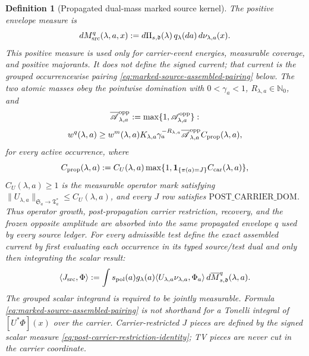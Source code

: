 \documentclass[11pt]{article}
\newtheorem{definition}[theorem]{Definition}
\newcommand{\one}{\mathbf 1}
\begin{document}
\begin{definition}[Propagated dual-mass marked source kernel]
The positive envelope measure is
\begin{equation}
\label{eq:source-incidence-space}
 dM_{\rm src}^{q}(\lambda,a,x):=
 d\Pi_{s,\mathfrak d}(\lambda)\,q_\lambda(da)\,d\nu_{\lambda,a}(x).
\end{equation}
This positive measure is used only for carrier-event energies, measurable
coverage, and positive majorants.  It does not define the signed current;
that current is the grouped occurrencewise pairing
\eqref{eq:marked-source-assembled-pairing} below.
The two atomic masses obey the pointwise domination
with $0<\gamma_a<1$, $R_{\lambda,a}\in\mathbb N_0$, and
\begin{equation}
\label{eq:opposite-amplitude-floor}
 \overline{\mathscr A}_{\lambda,a}^{\rm opp}
 :=\max\{1,\mathscr A_{\lambda,a}^{\rm opp}\}:
\end{equation}
\begin{equation}
\label{eq:source-incidence-envelope}
 w^q(\lambda,a)\ge w^m(\lambda,a)K_{\lambda,a}
 \gamma_a^{-R_{\lambda,a}}\overline{\mathscr A}_{\lambda,a}^{\rm opp}
 C_{\rm prop}(\lambda,a),
\end{equation}
for every active occurrence, where
\begin{equation}
\label{eq:propagated-operator-carrier-mark}
 C_{\rm prop}(\lambda,a):=
 C_U(\lambda,a)\max\{1,\one_{\{\pi(a)=J\}}C_{\rm car}(\lambda,a)\},
\end{equation}
$C_U(\lambda,a)\ge1$ is the measurable
operator mark satisfying
$\|U_{\lambda,a}\|_{\mathfrak S_a\to\mathfrak T_a^*}
\le C_U(\lambda,a)$, and every $J$ row satisfies
$\mathrm{POST\_CARRIER\_DOM}$.  Thus operator growth,
post-propagation carrier restriction, recovery, and the frozen
opposite amplitude are absorbed into the same propagated envelope $q$ used
by every source ledger.  For every admissible test define
the exact assembled current by first evaluating each occurrence in its
typed source/test dual and only then integrating the scalar result:
\begin{equation}
\label{eq:marked-source-assembled-pairing}
 \langle J_{\rm src},\Phi\rangle:=
 \int s_{\rm pol}(a)g_\lambda(a)
       \langle U_{\lambda,a}\nu_{\lambda,a},\Phi_a\rangle
       \,d\overline M_{s,\mathfrak d}^{q}(\lambda,a).
\end{equation}
The grouped scalar integrand is required to be jointly measurable.  Formula
\eqref{eq:marked-source-assembled-pairing} is not shorthand for a Tonelli
integral of $[U^*\Phi](x)$ over the carrier.  Carrier-restricted $J$ pieces
are defined by the signed scalar measure
\eqref{eq:post-carrier-restriction-identity}; TV pieces are never cut in the
carrier coordinate.


\end{definition}
\end{document}
